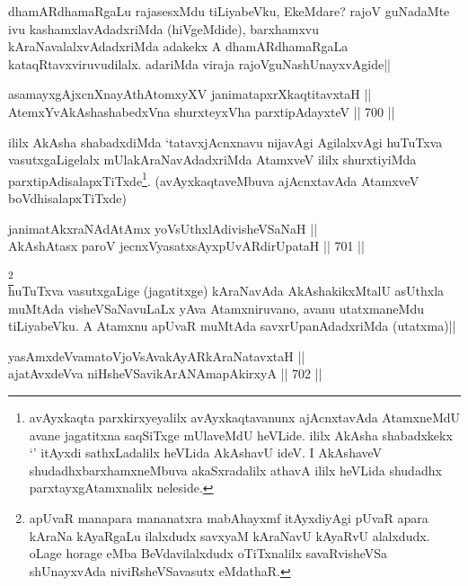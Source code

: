 \begin{artha} 
dhamARdhamaRgaLu rajasesxMdu tiLiyabeVku, EkeMdare? rajoV guNadaMte 
ivu kashamxlavAdadxriMda (hiVgeMdide), barxhamxvu 
kAraNavalalxvAdadxriMda adakekx A dhamARdhamaRgaLa 
kataqRtavxviruvudilalx. adariMda viraja rajoVguNashUnayxvAgide||
\end{artha}


\begin{shl}
asamayxgAjxcnXnayAthAtomxyXV janimatapxrXkaqtitavxtaH || \\
AtemxYvA\s \s kAshashabedxVna shurxteyxVha parxtipAdayxteV ||  700 ||  
\end{shl}

\begin{artha} 
ililx AkAsha shabadxdiMda `tatavxjAcnxnavu nijavAgi AgilalxvAgi 
huTuTxva vasutxgaLigelalx mUlakAraNavAdadxriMda AtamxveV ililx 
shurxtiyiMda parxtipAdisalapxTiTxde\footnote[1]{avAyxkaqta 
parxkirxyeyalilx avAyxkaqtavanunx ajAcnxtavAda AtamxneMdU avane 
jagatitxna saqSiTxge mUlaveMdU heVLide. ililx AkAsha shabadxkekx 
`\stext' itAyxdi sathxLadalilx heVLida AkAshavU ideV. I AkAshaveV 
shudadhxbarxhamxneMbuva akaSxradalilx athavA ililx heVLida shudadhx 
parxtayxgAtamxnalilx neleside.}. (avAyxkaqtaveMbuva 
ajAcnxtavAda AtamxveV boVdhisalapxTiTxde)
\end{artha}


\begin{shl}
janimatAkxraNAdAtAmx yoV\s sUthxlAdivisheVSaNaH || \\
AkAshAtasx paroV jecnxVyasatxsAyxpUvARdirUpataH ||  701 ||  
\end{shl}

\begin{artha} 
\footnote[2]{apUvaR manapara mananatxra mabAhayxmf itAyxdiyAgi pUvaR 
apara kAraNa kAyaRgaLu ilalxdudx savxyaM kAraNavU kAyaRvU alalxdudx. 
oLage horage eMba BeVdavilalxdudx oTiTxnalilx savaRvisheVSa 
shUnayxvAda niviRsheVSavasutx eMdathaR.}\\
huTuTxva vasutxgaLige (jagatitxge) kAraNavAda AkAshakikxMtalU asUthxla 
muMtAda visheVSaNavuLaLx yAva Atamxniruvano, avanu utatxmaneMdu 
tiLiyabeVku. A Atamxnu apUvaR muMtAda savxrUpanAdadxriMda (utatxma)||
\end{artha}


\begin{shl}
yasAmxdeVvamatoV\s joV\s sAvakAyARkAraNatavxtaH || \\
ajatAvxdeVva niHsheVSavikArANAmapAkirxyA ||  702 ||  
\end{shl}

